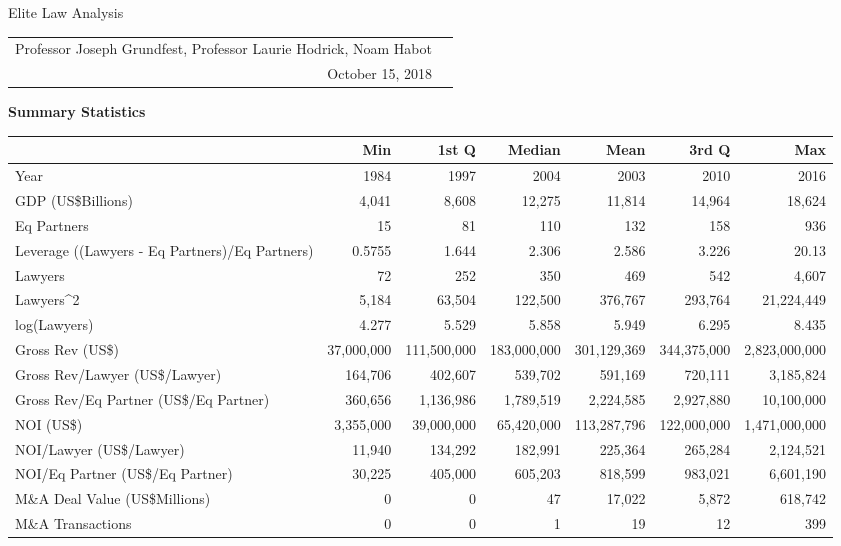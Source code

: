 \documentclass{article}
\begin{document}
\begin{center}{\LARGE Elite Law Analysis}
\\
\begin{tabular}{rl}\\Professor Joseph Grundfest, Professor Laurie Hodrick, Noam Habot \\October 15, 2018\end{tabular}\end{center}{\large \textbf{Summary Statistics} }%
\begin{table}[H]
\centering
\begin{tabular}{lrrrrrr}
  \hline
 & Min & 1st Q & Median & Mean & 3rd Q & Max \\ 
  \hline
Year & 1984 & 1997 & 2004 & 2003 & 2010 & 2016 \\ 
  GDP (US\$Billions) & 4,041 & 8,608 & 12,275 & 11,814 & 14,964 & 18,624 \\ 
  Eq Partners & 15 & 81 & 110 & 132 & 158 & 936 \\ 
  Leverage ((Lawyers - Eq Partners)/Eq Partners) & 0.5755 & 1.644 & 2.306 & 2.586 & 3.226 & 20.13 \\ 
  Lawyers & 72 & 252 & 350 & 469 & 542 & 4,607 \\ 
  Lawyers^2 & 5,184 & 63,504 & 122,500 & 376,767 & 293,764 & 21,224,449 \\ 
  log(Lawyers) & 4.277 & 5.529 & 5.858 & 5.949 & 6.295 & 8.435 \\ 
   \hline
Gross Rev (US\$) & 37,000,000 & 111,500,000 & 183,000,000 & 301,129,369 & 344,375,000 & 2,823,000,000 \\ 
  Gross Rev/Lawyer (US\$/Lawyer) & 164,706 & 402,607 & 539,702 & 591,169 & 720,111 & 3,185,824 \\ 
  Gross Rev/Eq Partner (US\$/Eq Partner) & 360,656 & 1,136,986 & 1,789,519 & 2,224,585 & 2,927,880 & 10,100,000 \\ 
  NOI (US\$) & 3,355,000 & 39,000,000 & 65,420,000 & 113,287,796 & 122,000,000 & 1,471,000,000 \\ 
  NOI/Lawyer (US\$/Lawyer) & 11,940 & 134,292 & 182,991 & 225,364 & 265,284 & 2,124,521 \\ 
  NOI/Eq Partner (US\$/Eq Partner) & 30,225 & 405,000 & 605,203 & 818,599 & 983,021 & 6,601,190 \\ 
   \hline
M\&A Deal Value (US\$Millions) & 0 & 0 & 47 & 17,022 & 5,872 & 618,742 \\ 
  M\&A Transactions & 0 & 0 & 1 & 19 & 12 & 399 \\ 

\end{tabular}
\end{table}
\end{document}
